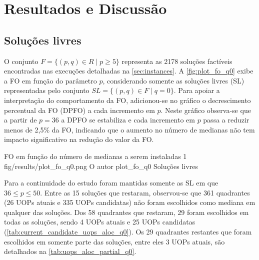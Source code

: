 \chapter{Resultados e Discussão} \label{cha:results}

\section{Soluções livres} \label{sec:solucoes_livres}

O conjunto $F = \{ (p,q) \in R \mid p \geq 5 \}$ representa as 2178 soluções factíveis encontradas nas execuções detalhadas na \autoref{sec:instances}. A \autoref{fig:plot_fo_q0} exibe a FO em função do parâmetro $p$, considerando somente as soluções livres (SL) representadas pelo conjunto $SL = \{ (p,q) \in F \mid q = 0 \}$. Para apoiar a interpretação do comportamento da FO, adicionou-se no gráfico o decrescimento percentual da FO (DPFO) a cada incremento em $p$. Neste gráfico observa-se que a partir de $p = 36$ a DPFO se estabiliza e cada incremento em $p$ passa a reduzir menos de 2,5\% da FO, indicando que o aumento no número de medianas não tem impacto significativo na redução do valor da FO.


\figurah
{FO em função do número de medianas a serem instaladas}
{1}
{fig/results/plot_fo_q0.png}
{O autor}
{plot_fo_q0}
{Soluções livres}
{}

Para a continuidade do estudo foram mantidas somente as SL em que $36 \leq p \leq 50$. Entre as 15 soluções que restaram, observou-se que 361 quadrantes (26 UOPs atuais e 335 UOPs candidatas) não foram escolhidos como mediana em qualquer das soluções. Dos 58 quadrantes que restaram, 29 foram escolhidos em todas as soluções, sendo 4 UOPs atuais e 25 UOPs candidatas (\autoref{tab:current_candidate_uops_aloc_q0}). Os 29 quadrantes restantes que foram escolhidos em somente parte das soluções, entre eles 3 UOPs atuais, são detalhados na \autoref{tab:uops_aloc_partial_q0}.

